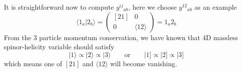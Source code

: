 \documentclass[12pt]{article}
\newcommand{\aket}[1]{|#1\rangle}
\newcommand{\sket}[1]{|#1]}
\newcommand{\inner}[2]{\langle #1 | #2 \rangle}
\begin{document}
It is straightforward now to compute $y^{ij}{}_{ab}$, here we choose $y^{12}{}_{ab}$ as an example 
\begin{equation}
    \inner{1_a}{2_b}=\begin{pmatrix}
        [21] & 0\\
        0 & \langle12\rangle
    \end{pmatrix}=1_a2_b
\end{equation}
From the 3 particle momentum conservation, we have known that 4D massless spinor-helicity variable should satisfy
\begin{equation}
    \aket{1}\propto\aket{2}\propto\aket{3}\qquad \text{or}\qquad \sket{1}\propto\sket{2}\propto\sket{3}
\end{equation}
which means one of $[21]$ and $\langle12\rangle$ will become vanishing.
\end{document}
